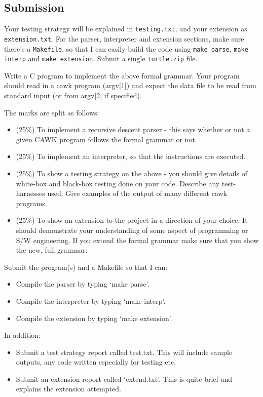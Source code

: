 \begin{exercise}
\subsection*{Submission}
Your testing strategy will be explained in \verb^testing.txt^, and your extension
as \verb^extension.txt^. For the parser, interpreter and extension sections, make
sure there's a \verb^Makefile^, so that I can easily build the code using \verb^make parse^,
\verb^make interp^ and \verb^make extension^. Submit a single \verb^turtle.zip^ file.

\end{exercise}



\begin{exercise}
Write a C program to implement the above formal grammar. Your program
should read in a cawk program (argv[1]) and expect the data
file to be read from standard input (or from argv[2] if specified).

The marks are split as follows:
\begin{itemize}
\item (25\%) To implement a recursive descent parser - this says
whether or not a given CAWK program follows the formal grammar or not.

\item (25\%) To implement an interpreter, so that the instructions are
executed.

\item (25\%) To show a testing strategy on the above -
you should give details of
white-box and black-box testing done on your code. Describe any
test-harnesses used. Give examples of the output of many different
cawk programs.

\item (25\%) To show an extension to the project in a direction of
your choice. It should demonstrate your understanding of some aspect
of programming or S/W engineering. If you extend the formal grammar
make sure that you show the new, full grammar.
\end{itemize}

Submit the program(s) and a Makefile so that I can:

\begin{itemize}
\item Compile the parser by typing `make parse'.
\item Compile the interpreter by typing `make interp'.
\item Compile the extension by typing `make extension'.
\end{itemize}

In addition:
\begin{itemize}
\item Submit a test strategy report called test.txt. This will include
sample outputs, any code written especially for testing etc.
\item Submit an extension report called `extend.txt'. This is quite
brief and explains the extension attempted.
\end{itemize}

\end{exercise}

